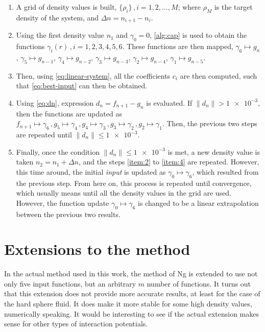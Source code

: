 \begin{enumerate}
    \item \label{item:1} A grid of density values is built, \(\{\rho_i\} \, , i=1,2,\dots,M\); where \(\rho_{M}\) is the target density of the system, and \(\Delta n = n_{i+1} - n_{i}\).
    \item \label{item:2} Using the first density value \(n_1\) and \(\gamma_0 = 0\), \autoref{alg:cap} is used to obtain the functions \(\gamma_i (r) \, , i=1,2,3,4,5,6\). These functions are then mapped, \(\gamma_6 \mapsto g_n\), \(\gamma_5 \mapsto g_{n-1}\), \(\gamma_4 \mapsto g_{n-2}\), \(\gamma_3 \mapsto g_{n-3}\), \(\gamma_2 \mapsto g_{n-4}\), \(\gamma_1 \mapsto g_{n-5}\).
    \item \label{item:3} Then, using \autoref{eq:linear-system}, all the coefficients \(c_i\) are then computed, such that \autoref{eq:best-input} can then be obtained.
    \item \label{item:4} Using \autoref{eq:dn}, expression \(d_n = f_{n+1} - g_n\) is evaluated. If \(\lVert d_n \rVert > \num{1e-3}\), then the functions are updated as \(f_{n+1} \mapsto \gamma_6 \, , g_5 \mapsto \gamma_4 \, , g_4 \mapsto \gamma_3 \, , g_3 \mapsto \gamma_2 \, , g_2 \mapsto \gamma_1\). Then, the previous two steps are repeated until \(\lVert d_n \rVert \leq \num{1e-3}\).
    \item \label{item:5} Finally, once the condition \(\lVert d_n \rVert \leq \num{1e-3}\) is met, a new density value is taken \(n_2 = n_1 + \Delta n\), and the steps \ref{item:2} to \ref{item:4} are repeated. However, this time around, the initial \emph{input} is updated as \(\gamma_{0} \mapsto \gamma_6\), which resulted from the previous step. From here on, this process is repeated until convergence, which usually means until all the density values in the grid are used. However, the function update \(\gamma_{0} \mapsto \gamma_6\) is changed to be a linear extrapolation between the previous two results.
\end{enumerate}

\section{Extensions to the method}
In the actual method used in this work, the method of Ng is extended to use not only five 
input functions, but an arbitrary \(m\) number of functions. It turns out that 
this extension does not provide more accurate results, at least for the case of the hard 
sphere fluid. It does make it more stable for some high density values, numerically 
speaking. It would be interesting to see if the actual extension makes sense for other 
types of interaction potentials.

